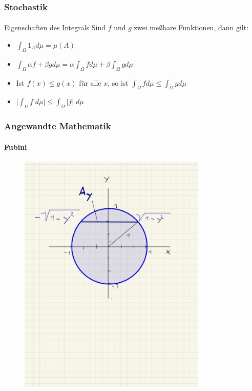 \documentclass{beamer}
\begin{document}
\begin{frame}
    \frametitle{Stochastik}
\framesubtitle{}
\begin{block}{Eigenschaften des Integrals}
    Sind $f$ und $g$ zwei meßbare Funktionen, dann gilt:
    \begin{itemize}
        \item $\int_{\Omega} 1_A  d\mu  = \mu (A)$  
    \item $\int_{\Omega} \alpha f  + \beta g d\mu = \alpha \int_{\Omega}  f d\mu + \beta  \int_{\Omega}  g d\mu$
    \item Ist $f(x) \leq g(x)$ für alle $x$, so ist $\int_{\Omega} f d\mu \leq \int_{\Omega} g d\mu$ 
    \item $ \biggl | \int_{\Omega} f \; d\mu \biggr | \leq \int_{\Omega} |f| \; d\mu $
    \end{itemize}
    \end{block}
\end{frame}

\begin{frame}
    \frametitle{Angewandte Mathematik}
\framesubtitle{Fubini}
\begin{figure}[H]
      \centering
    \includegraphics[width=0.8\textwidth]{img/Kreis}
\end{figure}
 \end{frame}
\end{document}
